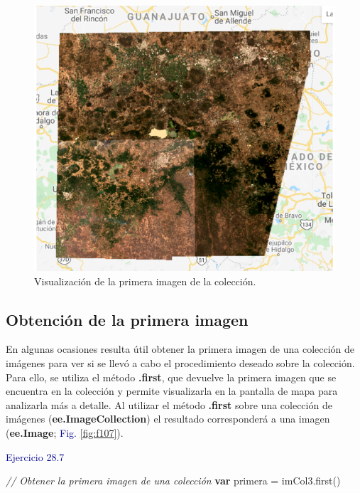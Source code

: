 \documentclass[
  12pt,
  letterpaper,
  twoside]{book}
\newenvironment{Shaded}{\begin{snugshade}}{\end{snugshade}}
\newcommand{\CommentTok}[1]{\textcolor[rgb]{0.24,0.58,0.00}{\textit{#1}}}
\newcommand{\ControlFlowTok}[1]{\textcolor[rgb]{0.00,0.00,0.00}{\textbf{#1}}}
\newcommand{\FunctionTok}[1]{\textcolor[rgb]{0.48,0.12,0.64}{#1}}
\newcommand{\NormalTok}[1]{#1}
\newcommand{\OperatorTok}[1]{\textcolor[rgb]{0.00,0.00,0.00}{#1}}
\newcommand\boldpurple[1]{\textcolor{darkpurple}{\textbf{#1}}}
\begin{document}
\begin{figure}[H]

{\centering \includegraphics[width=0.8\linewidth]{Img/imcol5sortcloud} 

}

\caption{Visualización de la primera imagen de la colección.}\label{fig:f106}
\end{figure}

\hypertarget{obtenciuxf3n-de-la-primera-imagen}{%
\subsection*{Obtención de la primera imagen}\label{obtenciuxf3n-de-la-primera-imagen}}

En algunas ocasiones resulta útil obtener la primera imagen de una colección de imágenes para ver si se llevó a cabo el procedimiento deseado sobre la colección. Para ello, se utiliza el método \boldpurple{.first}, que devuelve la primera imagen que se encuentra en la colección y permite visualizarla en la pantalla de mapa para analizarla más a detalle. Al utilizar el método \boldpurple{.first} sobre una colección de imágenes (\boldpurple{ee.ImageCollection}) el resultado corresponderá a una imagen (\boldpurple{ee.Image}; \textcolor{darkblue}{Fig. } \ref{fig:f107}).

\textcolor{darkblue}{Ejercicio 28.7}

\begin{Shaded}
\begin{Highlighting}[]
\CommentTok{// Obtener la primera imagen de una colección}
\ControlFlowTok{var}\NormalTok{ primera }\OperatorTok{=}\NormalTok{ imCol3}\OperatorTok{.}\FunctionTok{first}\NormalTok{()}
\end{Highlighting}
\end{Shaded}
\end{document}
